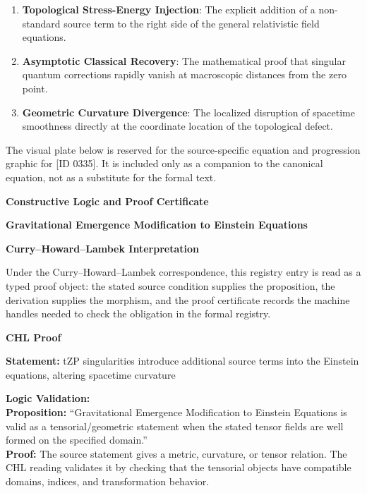 \begin{enumerate}[leftmargin=1.6em,itemsep=6pt,topsep=4pt]
\item \textbf{Topological Stress-Energy Injection}: The explicit addition of a non-standard source term to the right side of the general relativistic field equations.
\item \textbf{Asymptotic Classical Recovery}: The mathematical proof that singular quantum corrections rapidly vanish at macroscopic distances from the zero point.
\item \textbf{Geometric Curvature Divergence}: The localized disruption of spacetime smoothness directly at the coordinate location of the topological defect.
\end{enumerate}

\begingroup\footnotesize\sloppy
The visual plate below is reserved for the source-specific equation and progression graphic for [ID 0335]. It is included only as a companion to the canonical equation, not as a substitute for the formal text.
\par\endgroup
\ifTZPDarkEdition
{}
\fi

\clearpage
\begingroup\tzpsupportsetup
\noindent\textbf{\fontsize{10.8pt}{12.8pt}\selectfont [ID 0335] Constructive Logic and Proof Certificate}\par
\noindent\textbf{\fontsize{10pt}{12pt}\selectfont Gravitational Emergence Modification to Einstein Equations}\par
\vspace{0.45em}
\begingroup
\footnotesize
\setlength{\parskip}{0.22em}
\setlength{\parindent}{0pt}
\noindent\textbf{Curry--Howard--Lambek Interpretation}\par
Under the Curry--Howard--Lambek correspondence, this registry entry is read as a typed proof
object: the stated source condition supplies the proposition, the derivation supplies the
morphism, and the proof certificate records the machine handles needed to check the obligation
in the formal registry.

\vspace{0.45em}
\noindent\textbf{CHL Proof}\par
\textbf{Statement:} tZP singularities introduce additional source terms into the Einstein equations,
altering spacetime curvature

\textbf{Logic Validation:}\\
\textbf{Proposition:} ``Gravitational Emergence Modification to Einstein Equations is valid as a
tensorial/geometric statement when the stated tensor fields are well formed on the
specified domain.''\\
\textbf{Proof:} The source statement gives a metric, curvature, or tensor relation. The CHL reading
validates it by checking that the tensorial objects have compatible domains, indices,
and transformation behavior.

